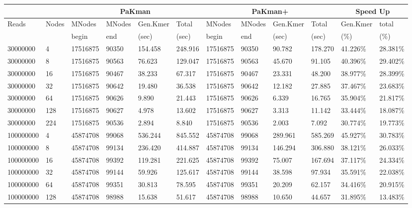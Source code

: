 \begin{tabular}{|l|l|l|l|l|l|l|l|l|l|l|l| }
\hline
\multicolumn{2}{|c|}{} & \multicolumn{4}{|c|}{{\sf PaKman} } & \multicolumn{4}{|c|}{{\sf PaKman+} } & \multicolumn{2}{|c|}{Speed Up} \\ 
\hline 
Reads & Nodes & MNodes & MNodes& Gen.Kmer & Total& MNodes & MNodes & Gen.Kmer & Total & Gen.Kmer & total \\\hline
 & & begin& end & (sec) & (sec) & begin & end & (sec) & (sec) & (\%) & (\%) \\\hline
30000000 &  4 & 17516875 & 90350 & 154.458& 248.916& 17516875 & 90350 & 90.782& 178.270 & 41.226\% & 28.381\% \\ \hline 
30000000 &  8 & 17516875 & 90563 & 76.623& 129.047& 17516875 & 90563 & 45.670& 91.105 & 40.396\% & 29.402\% \\ \hline 
30000000 &  16 & 17516875 & 90467 & 38.233& 67.317& 17516875 & 90467 & 23.331& 48.200 & 38.977\% & 28.399\% \\ \hline 
30000000 &  32 & 17516875 & 90642 & 19.480& 36.538& 17516875 & 90642 & 12.182& 27.885 & 37.467\% & 23.683\% \\ \hline 
30000000 &  64 & 17516875 & 90626 & 9.890& 21.443& 17516875 & 90626 & 6.339& 16.765 & 35.904\% & 21.817\% \\ \hline 
30000000 &  128 & 17516875 & 90627 & 4.978& 13.602& 17516875 & 90627 & 3.313& 11.142 & 33.444\% & 18.087\% \\ \hline 
30000000 &  224 & 17516875 & 90536 & 2.894& 8.840& 17516875 & 90536 & 2.003& 7.092 & 30.774\% & 19.773\% \\ \hline 
100000000 &  4 & 45874708 & 99068 & 536.244& 845.552& 45874708 & 99068 & 289.961& 585.269 & 45.927\% & 30.783\% \\ \hline 
100000000 &  8 & 45874708 & 99134 & 236.420& 414.887& 45874708 & 99134 & 146.294& 306.880 & 38.121\% & 26.033\% \\ \hline 
100000000 &  16 & 45874708 & 99392 & 119.281& 221.625& 45874708 & 99392 & 75.007& 167.694 & 37.117\% & 24.334\% \\ \hline 
100000000 &  32 & 45874708 & 99144 & 59.926& 125.617& 45874708 & 99144 & 38.598& 97.934 & 35.591\% & 22.038\% \\ \hline 
100000000 &  64 & 45874708 & 99351 & 30.813& 78.595& 45874708 & 99351 & 20.209& 62.157 & 34.416\% & 20.915\% \\ \hline 
100000000 &  128 & 45874708 & 98988 & 15.638& 51.617& 45874708 & 98988 & 10.650& 44.657 & 31.895\% & 13.483\% \\ \hline 

\end{tabular}
